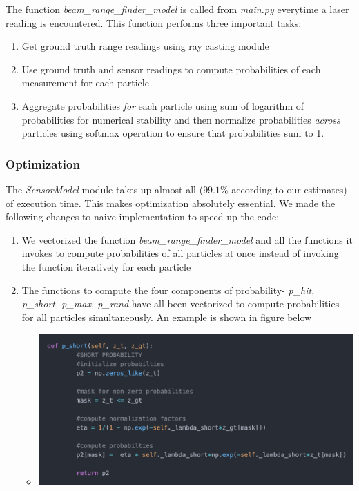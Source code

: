 \documentclass[12pt, a4paper]{article}
\begin{document}
The function \textit{beam\_range\_finder\_model} is called from \textit{main.py} everytime a laser reading is encountered. This function performs three important tasks:
\begin{enumerate}
  \item Get ground truth range readings using ray casting module
  \item Use ground truth and sensor readings to compute probabilities of each measurement for each particle
  \item Aggregate probabilities \textit{for} each particle using sum of logarithm of probabilities for numerical stability and then normalize probabilities \textit{across} particles using softmax operation to ensure that probabilities sum to 1.
\end{enumerate}
\subsubsection{Optimization}
The \textit{SensorModel} module takes up almost all ($99.1\%$ according to our estimates) of execution time. This makes optimization absolutely essential. We made the following changes to naive implementation to speed up the code:
\begin{enumerate}
  \item We vectorized the function \textit{beam\_range\_finder\_model} and all the functions it invokes to compute probabilities of all particles at once instead of invoking the function iteratively for each particle
  \item The functions to compute the four components of probability- \textit{p\_hit, p\_short, p\_max, p\_rand} have all been vectorized to compute probabilities for all particles simultaneously. An example is shown in figure below
  \begin{itemize}
    \item 
    \begin{minipage}[t]{\linewidth}
      \vspace{0pt}
      \begin{center}
        \includegraphics[scale=0.3]{./results/sensor_model_opt.png}
        \label{fig:sm_1}
      \end{center}
    \end{minipage}
  \end{itemize}
\end{enumerate}
\end{document}
